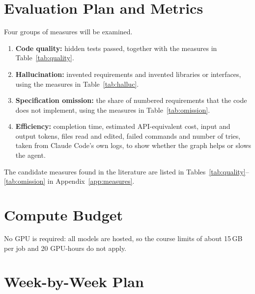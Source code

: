 \documentclass{article}
\begin{document}
\section{Evaluation Plan and Metrics}\label{sec:eval}

Four groups of measures will be examined.
\begin{enumerate}
  \item \textbf{Code quality:} hidden tests passed, together with the measures in Table~\ref{tab:quality}.
  \item \textbf{Hallucination:} invented requirements and invented libraries or interfaces, using the measures in Table~\ref{tab:halluc}.
  \item \textbf{Specification omission:} the share of numbered requirements that the code does not implement, using the measures in Table~\ref{tab:omission}.
  \item \textbf{Efficiency:} completion time, estimated API-equivalent cost, input and output tokens, files read and edited, failed commands and number of tries,
        taken from Claude Code's own logs, to show whether the graph helps or slows the agent.
\end{enumerate}
The candidate measures found in the literature are listed in Tables~\ref{tab:quality}--\ref{tab:omission} in Appendix~\ref{app:measures}.

\section{Compute Budget}

No GPU is required: all models are hosted, so the course limits of about 15\,GB per job and 20 GPU-hours do not apply.

\section{Week-by-Week Plan}
\end{document}
